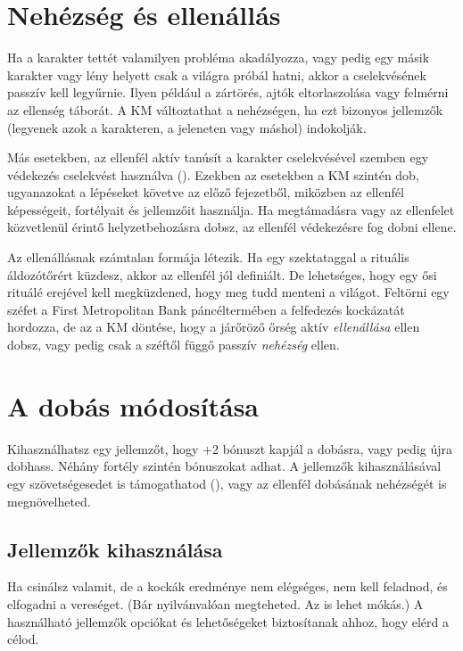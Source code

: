 \section{Nehézség és ellenállás}

Ha a karakter tettét valamilyen probléma akadályozza, vagy pedig egy másik karakter vagy lény helyett csak a világra próbál hatni, akkor a cselekvésének passzív  kell legyűrnie. Ilyen például a zártörés, ajtók eltorlaszolása vagy felmérni az ellenség táborát. A KM változtathat a nehézségen, ha ezt bizonyos jellemzők (legyenek azok a karakteren, a jeleneten vagy máshol) indokolják.

Más esetekben, az ellenfél aktív  tanúsít a karakter cselekvésével szemben egy védekezés cselekvést használva (). Ezekben az esetekben a KM szintén dob, ugyanazokat a lépéseket követve az előző fejezetből, miközben az ellenfél képességeit, fortélyait és jellemzőit használja. Ha megtámadásra vagy az ellenfelet közvetlenül érintő helyzetbehozásra dobsz, az ellenfél védekezésre fog dobni ellene.

Az ellenállásnak számtalan formája létezik. Ha egy szektataggal a rituális áldozótőrért küzdesz, akkor az ellenfél jól definiált. De lehetséges, hogy egy ősi rituálé erejével kell megküzdened, hogy meg tudd menteni a világot. Feltörni egy széfet a First Metropolitan Bank páncéltermében a felfedezés kockázatát hordozza, de az a KM döntése, hogy a járőröző őrség aktív \emph{ellenállása} ellen dobsz, vagy pedig csak a széftől függő passzív \emph{nehézség} ellen.

\section{A dobás módosítása}

Kihasználhatsz egy jellemzőt, hogy +2 bónuszt kapjál a dobásra, vagy pedig újra dobhass. Néhány fortély szintén bónuszokat adhat. A jellemzők kihasználásával egy szövetségesedet is támogathatod (), vagy az ellenfél dobásának nehézségét is megnövelheted.

\subsection{Jellemzők kihasználása}

Ha csinálsz valamit, de a kockák eredménye nem elégséges, nem kell feladnod, és elfogadni a vereséget. (Bár nyilvánvalóan megteheted. Az is lehet mókás.) A használható jellemzők opciókat és lehetőségeket biztosítanak ahhoz, hogy elérd a célod.

